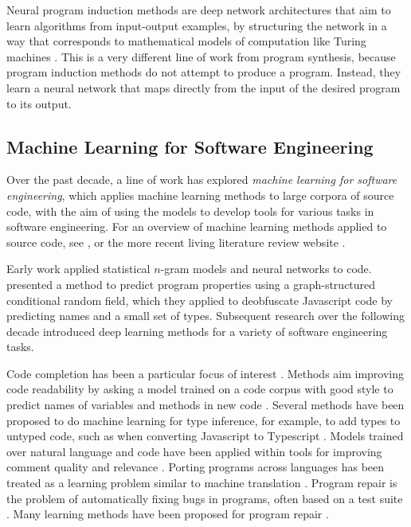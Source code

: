Neural program induction methods are deep network architectures that aim to learn algorithms from input-output examples, by structuring the network in a way that corresponds to mathematical models of computation like Turing machines \citep{ntm,ngpu,nram,dnc}. This is a very different line of work from program synthesis, because program induction methods do not attempt to produce a program. Instead, they learn a neural network that maps directly from the input of the desired program to its output.

\subsection{Machine Learning for Software Engineering}

Over the past decade, a line of work has explored \emph{machine learning for software engineering}, which applies machine learning methods to large corpora of source code, with the aim of using the models to develop tools for various tasks in software engineering. For an overview of machine learning methods applied to source code, see \cite{naturalness-survey}, or the more recent living literature review website \citep{Allamanis_website}.

Early work applied statistical $n$-gram models \citep{Hindle2012-ed, Allamanis2013-da} and neural networks \citep{Maddison2014-os,Raychev2014-gb} to code. \cite{Raychev2015-hk} presented a method to predict program properties using a graph-structured conditional random field, which they applied to deobfuscate Javascript code by predicting names and a small set of types. Subsequent research over the following decade introduced deep learning methods for a variety of software engineering tasks.

Code completion has been a particular focus of interest \citep{ethpy150,Karampatsis2020-ry, Svyatkovskiy2020-hy, Kim2020-mn}. Methods aim improving code readability by asking a model trained on a code corpus with good style to predict names of variables and methods in new code \citep{Raychev2015-hk,Allamanis2014-on,code2vec}. Several methods have been proposed to do machine learning for type inference, for example, to add types to untyped code, such as when converting Javascript to Typescript \citep{Hellendoorn2018-ce, Pandi2020-ge, Pradel2020-vm, Wei2020-tw}. Models trained over natural language and code have been applied within tools for improving comment quality and relevance \citep{Louis2020-ei,Panthaplackel2021-hu}. Porting programs across languages has been treated as a learning problem similar to machine translation \citep{Roziere2020-gj,Nguyen2013-nj,Karaivanov2014-dh}. Program repair is the problem of automatically fixing bugs in programs, often based on a test suite \citep{genprog,prophet}. Many learning methods have been proposed for program repair \citep{Allamanis2018-ht,Tarlow2019-ya,Hellendoorn2019-ux,hoppity,drrepair,sequencer,deepbugs}.

